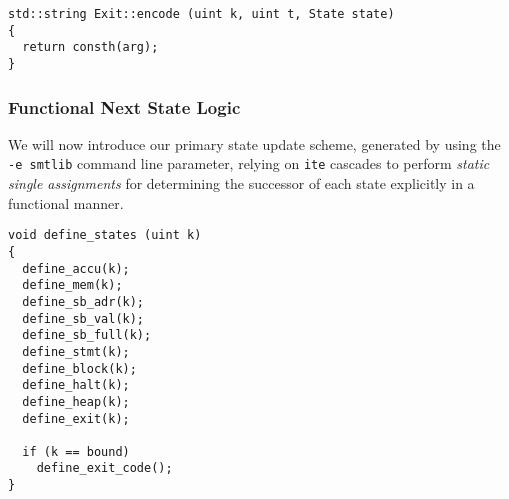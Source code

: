 \begin{lstlisting}[style=c++, style=encode]
std::string Exit::encode (uint k, uint t, State state)
{
  return consth(arg);
}
\end{lstlisting}

\subsubsection{Functional Next State Logic}


\noindent
We will now introduce our primary state update scheme, generated by using the \texttt{-e smtlib} command line parameter,
relying on \texttt{ite} cascades to perform \emph{static single assignments} for determining the successor of each state explicitly in a functional manner.%


\begin{lstlisting}[style=c++]
void define_states (uint k)
{
  define_accu(k);
  define_mem(k);
  define_sb_adr(k);
  define_sb_val(k);
  define_sb_full(k);
  define_stmt(k);
  define_block(k);
  define_halt(k);
  define_heap(k);
  define_exit(k);

  if (k == bound)
    define_exit_code();
}
\end{lstlisting}

